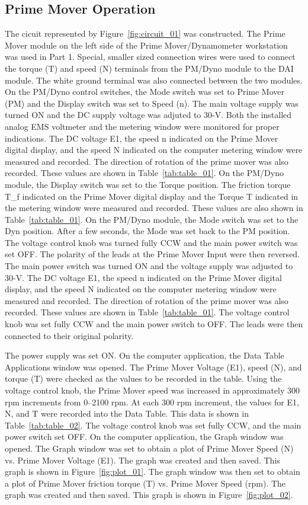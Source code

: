 \documentclass{article}
\begin{document}
\subsection{Prime Mover Operation}
\label{part1} The cicuit represented by Figure~\ref{fig:circuit_01} was constructed. The Prime Mover
module on the left side of the Prime Mover/Dynamometer workstation was used in Part 1. Special, smaller
sized connection wires were used to connect the torque (T) and speed (N) terminals from the PM/Dyno module
to the DAI module. The white ground terminal was also connected between the two modules. On the PM/Dyno 
control switches, the Mode switch was set to Prime Mover (PM) and the Display switch was set to Speed (n).
The main voltage supply was turned ON and the DC supply voltage was adjuted to 30-V. Both the installed analog 
EMS voltmeter and the metering window were monitored for proper indications. The DC voltage E1, the speed n 
indicated on the Prime Mover digital display, and the speed N indicated on the computer metering window 
were measured and recorded. The direction of rotation of the prime mover was also recorded. These values are
shown in Table~\ref{tab:table_01}. On the PM/Dyno module, the Display switch was set to the Torque position.
The friction torque T_f indicated on the Prime Mover digital display and the Torque T indicated in the
metering window were measured and recorded. These values are also shown in Table~\ref{tab:table_01}. 
On the PM/Dyno module, the Mode switch was set to the Dyn position. After a few seconds, the Mode was set
back to the PM position. The voltage control knob was turned fully CCW and the main power switch was set OFF.
The polarity of the leads at the Prime Mover Input were then reversed. The main power switch was turned ON and 
the voltage supply was adjusted to 30-V. The DC voltage E1, the speed n indicated on the Prime Mover digital 
display, and the speed N indicated on the computer metering window were measured and recorded. The direction 
of rotation of the prime mover was also recorded. These values are shown in Table~\ref{tab:table_01}. The voltage
control knob was set fully CCW and the main power switch to OFF. The leads were then connected to their original
polarity. 

The power supply was set ON. On the computer application, the Data Table Applications window was 
opened. The Prime Mover Voltage (E1), speed (N), and torque (T) were checked as the values to be recorded in the 
table. Using the voltage control knob, the Prime Mover speed was increased in approximately 300 rpm increments
from 0--2100 rpm. At each 300 rpm increment, the values for E1, N, and T were recorded into the Data Table. This
data is shown in Table~\ref{tab:table_02}. The voltage control knob was set fully CCW, and the main power switch 
set OFF. On the computer application, the Graph window was opened. The Graph window was set to obtain a plot of 
Prime Mover Speed (N) vs. Prime Mover Voltage (E1). The graph was created and then saved. This graph is shown in
Figure~\ref{fig:plot_01}. The graph window was then set to obtain a plot of Prime Mover friction torque (T) vs. 
Prime Mover Speed (rpm). The graph was created and then saved. This graph is shown in Figure~\ref{fig:plot_02}.
\end{document}
